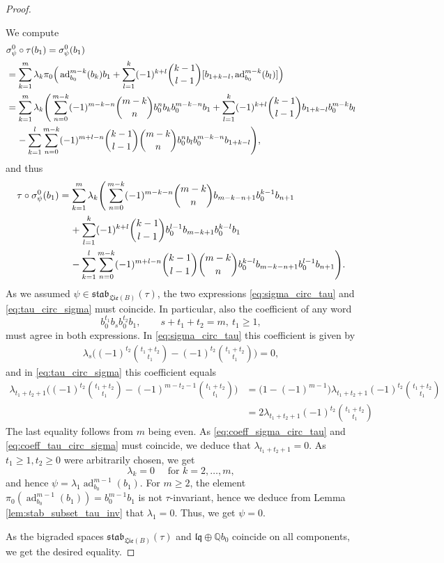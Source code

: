 \documentclass[11pt, a4paper]{amsart}
\numberwithin{equation}{section}
\theoremstyle{definition}
\newcommand{\Q}{\mathbb{Q}}
\newcommand{\lqq}{\mathfrak{lq}}
\newcommand{\ad}{\operatorname{ad}}
\newcommand{\Lie}{\mathfrak{Lie}}
\newcommand{\stab}{\mathfrak{stab}}
\begin{document}
\begin{proof}
\begin{caselist}
\noindent
We compute 
\begin{align} \label{eq:sigma_circ_tau}
&\sigma_{\psi}^0\circ\tau(b_1)=\sigma_\psi^0(b_1) \\
&=\sum_{k=1}^m \lambda_k\pi_0\Big(\ad_{b_0}^{m-k}(b_k) b_1+\sum_{l=1}^k(-1)^{k+l}\binom{k-1}{l-1}[b_{1+k-l},\ad_{b_0}^{m-k}(b_l)]\Big) \nonumber\\
&=\sum_{k=1}^m \lambda_k \Bigg(\sum_{n=0}^{m-k} (-1)^{m-k-n} \binom{m-k}{n} b_0^nb_kb_0^{m-k-n}b_1+\sum_{l=1}^k (-1)^{k+l} \binom{k-1}{l-1}b_{1+k-l}b_0^{m-k}b_l \nonumber\\
&\hspace{0.4cm} - \sum_{k=1}^l\sum_{n=0}^{m-k}(-1)^{m+l-n} \binom{k-1}{l-1}\binom{m-k}{n}b_0^nb_lb_0^{m-k-n}b_{1+k-l}\Bigg), \nonumber
\end{align}
and thus
\begin{align} \label{eq:tau_circ_sigma}
\tau\circ\sigma^0_\psi(b_1)&=\sum_{k=1}^m \lambda_k \Bigg(\sum_{n=0}^{m-k} (-1)^{m-k-n} \binom{m-k}{n} b_{m-k-n+1}b_0^{k-1}b_{n+1}\\
&\hspace{0.4cm}+\sum_{l=1}^k (-1)^{k+l} \binom{k-1}{l-1}b_0^{l-1}b_{m-k+1}b_0^{k-l}b_1 \nonumber\\
&\hspace{0.4cm} - \sum_{k=1}^l\sum_{n=0}^{m-k}(-1)^{m+l-n} \binom{k-1}{l-1}\binom{m-k}{n}b_0^{k-l}b_{m-k-n+1}b_0^{l-1}b_{n+1}\Bigg). \nonumber
\end{align}
As we assumed $\psi\in\stab_{\Lie(B)}(\tau)$, the two expressions \eqref{eq:sigma_circ_tau} and \eqref{eq:tau_circ_sigma} must coincide. In particular, also the coefficient of any word
\[b_0^{t_1}b_sb_0^{t_2}b_1,\qquad s+t_1+t_2=m,\ t_1\geq1,\]
must agree in both expressions. In \eqref{eq:sigma_circ_tau} this coefficient is given by
\begin{align} \label{eq:coeff_sigma_circ_tau}
 \lambda_s \Big( (-1)^{t_2}\binom{t_1+t_2}{t_1}- (-1)^{t_2}\binom{t_1+t_2}{t_1}\Big)=0,  
\end{align}
and in \eqref{eq:tau_circ_sigma} this coefficient equals
\begin{align} \label{eq:coeff_tau_circ_sigma}
\lambda_{t_1+t_2+1}\Big((-1)^{t_2} \binom{t_1+t_2}{t_1}-(-1)^{m-t_2-1}\binom{t_1+t_2}{t_1}\Big)&=\Big(1-(-1)^{m-1}\Big) \lambda_{t_1+t_2+1}(-1)^{t_2} \binom{t_1+t_2}{t_1} \nonumber\\
&=2\lambda_{t_1+t_2+1}(-1)^{t_2} \binom{t_1+t_2}{t_1} 
\end{align}
The last equality follows from $m$ being even. As \eqref{eq:coeff_sigma_circ_tau} and \eqref{eq:coeff_tau_circ_sigma} must coincide, we deduce that $\lambda_{t_1+t_2+1}=0$. As $t_1\geq1,t_2\geq 0$ were arbitrarily chosen, we get
\[\lambda_k=0 \quad \text{ for } k=2,\ldots,m,\]
and hence $\psi=\lambda_1 \ad_{b_0}^{m-1}(b_1)$. For $m\geq2$, the element $\pi_0(\ad_{b_0}^{m-1}(b_1))=b_0^{m-1}b_1$ is not $\tau$-invariant, hence we deduce from Lemma \ref{lem:stab_subset_tau_inv} that $\lambda_1=0$. Thus, we get $\psi=0$.
\end{caselist}
As the bigraded spaces $\stab_{\Lie(B)}(\tau)$ and $\lqq\oplus\Q b_0$ coincide on all components, we get the desired equality.
\end{proof}
\end{document}
